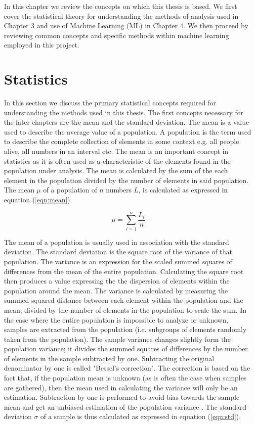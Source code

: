 In this chapter we review the concepts on which this thesis is based. We first cover the statistical theory for understanding the methods of analysis used in Chapter 3 and use of Machine Learning (ML) in Chapter 4. We then proceed by reviewing common concepts and specific methods within machine learning employed in this project.


\section{Statistics}

In this section we discuss the primary statistical concepts required for understanding the methods used in this thesis. The first concepts necessary for the later chapters are the mean and the standard deviation. The mean is a value used to describe the average value of a population. A population is the term used to describe the complete collection of elements in some context e.g. all people alive, all numbers in an interval etc. The mean is an important concept in statistics as it is often used as a characteristic of the elements found in the population under analysis. The mean is calculated by the sum of the each element in the population divided by the number of elements in said population. The mean $\mu$ of a population of $n$ numbers $L$, is calculated as expressed in equation (\ref{eqn:mean}).

\begin{equation}
\label{eqn:mean}
\mu = \sum_{i=1}^n \frac{L_i}{n}
\end{equation}

The mean of a population is usually used in association with the standard deviation. The standard deviation is the square root of the variance of that population. The variance is an expression for the scaled summed squares of differences from the mean of the entire population. Calculating the square root then produces a value expressing the the dispersion of elements within the population around the mean. The variance is calculated by measuring the summed squared distance between each element within the population and the mean, divided by the number of elements in the population to scale the sum. In the case where the entire population is impossible to analyze or unknown, samples are extracted from the population (i.e. subgroups of elements randomly taken from the population). The sample variance changes slightly form the population variance; it divides the summed squares of differences by the number of elements in the sample subtracted by one. Subtracting the original denominator by one is called "Bessel's correction". The correction is based on the fact that, if the population mean is unknown (as is often the case when samples are gathered), then the mean used in calculating the variance will only be an estimation. Subtraction by one is performed to avoid bias towards the sample mean and get an unbiased estimation of the population variance \cite{so2008sample, nobach2020practical}. The standard deviation $\sigma$ of a sample is thus calculated as expressed in equation (\ref{eqn:std}).


